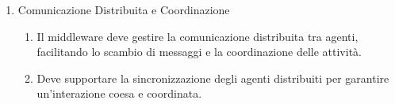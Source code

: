 \begin{enumerate}
      \item  Comunicazione Distribuita e Coordinazione
            \begin{enumerate}
                  \item  Il middleware deve gestire la comunicazione distribuita tra agenti, facilitando
                        lo scambio di messaggi e la coordinazione delle attività.
                  \item Deve supportare la sincronizzazione degli agenti distribuiti per garantire
                        un'interazione coesa e coordinata.
            \end{enumerate}
\end{enumerate}


